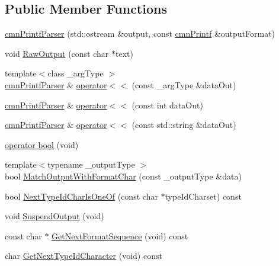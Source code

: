 \subsection*{Public Member Functions}
\begin{DoxyCompactItemize}
\item 
\hyperlink{classcmn_printf_parser_ac1b7a21e87f67c2794d96b6396684605}{cmn\-Printf\-Parser} (std\-::ostream \&output, const \hyperlink{classcmn_printf}{cmn\-Printf} \&output\-Format)
\item 
void \hyperlink{classcmn_printf_parser_ae00c0714e7d6a40d948adea3f853831a}{Raw\-Output} (const char $\ast$text)
\item 
{\footnotesize template$<$class \-\_\-arg\-Type $>$ }\\\hyperlink{classcmn_printf_parser}{cmn\-Printf\-Parser} \& \hyperlink{classcmn_printf_parser_ac71563adac7e161bcdfd2818fd1d5223}{operator$<$$<$} (const \-\_\-arg\-Type \&data\-Out)
\item 
\hyperlink{classcmn_printf_parser}{cmn\-Printf\-Parser} \& \hyperlink{classcmn_printf_parser_a09d2d6905e95ed2be82b6818bf33bdf7}{operator$<$$<$} (const int data\-Out)
\item 
\hyperlink{classcmn_printf_parser}{cmn\-Printf\-Parser} \& \hyperlink{classcmn_printf_parser_a89b9cf7fb07f9515f36afc8d4615f51d}{operator$<$$<$} (const std\-::string \&data\-Out)
\item 
\hyperlink{classcmn_printf_parser_a5658260befa307892d4d0f5a8d64ede2}{operator bool} (void)
\item 
{\footnotesize template$<$typename \-\_\-output\-Type $>$ }\\bool \hyperlink{classcmn_printf_parser_a9f49769b75aac6b4ca6043d5f8f8067b}{Match\-Output\-With\-Format\-Char} (const \-\_\-output\-Type \&data)
\item 
bool \hyperlink{classcmn_printf_parser_a221dc91e102dcdb2f8cbd52054a4ab90}{Next\-Type\-Id\-Char\-Is\-One\-Of} (const char $\ast$type\-Id\-Charset) const 
\item 
void \hyperlink{classcmn_printf_parser_a0c353c4744a66855b1e276a21da5e46f}{Suspend\-Output} (void)
\item 
const char $\ast$ \hyperlink{classcmn_printf_parser_a2908968461a5524557ec1edbc08d244e}{Get\-Next\-Format\-Sequence} (void) const 
\item 
char \hyperlink{classcmn_printf_parser_aa27ed28b25589a5fd2d8719c2510f265}{Get\-Next\-Type\-Id\-Character} (void) const 
\end{DoxyCompactItemize}
